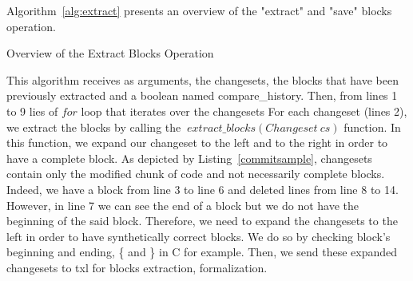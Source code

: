 \documentclass[conference]{IEEEtran}
\begin{document}
Algorithm~\ref{alg:extract} presents an overview of the "extract" and "save" blocks operation.

\begin{algorithm}[H]


 \caption{Overview of the Extract Blocks Operation\label{alg:extract}}
\end{algorithm}

This algorithm receives as arguments, the changesets, the blocks that have been previously extracted and a boolean named compare\_history.
Then, from lines 1 to 9 lies of $for$ loop that iterates over the changesets
For each changeset (lines 2), we extract the blocks by calling the $~extract\_blocks(Changeset~cs)$ function.
In this function, we expand our changeset to the left and to the right in order to have a complete block.
As depicted by Listing~\ref{commitsample}, changesets contain only the modified chunk of code and not necessarily complete blocks.
Indeed, we have a block from line 3 to line 6 and deleted lines from line 8 to 14.
However, in line 7 we can see the end of a block but we do not have the beginning of the said block.
Therefore, we need to expand the changesets to the left in order to have synthetically correct blocks.
We do so by checking block's beginning and ending, \{ and \} in C for example.
Then, we send these expanded changesets to txl for blocks extraction, formalization.

\noindent\begin{minipage}{0.90\linewidth}

  

\end{minipage}
\end{document}
